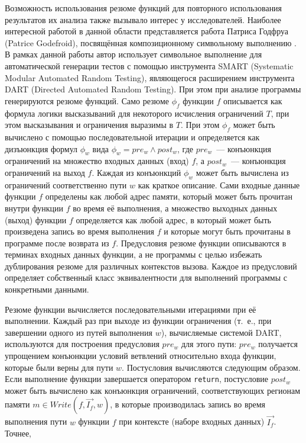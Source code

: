 Возможность использования резюме функций для повторного использования результатов их анализа также вызывало интерес у исследователей. Наиболее интересной работой в данной области представляется работа Патриса Годфруа (Patrice Godefroid), посвящённая композиционному символьному выполнению \cite{godefroid-comp}. В рамках данной работы автор использует символьное выполнение для автоматической генерации тестов с помощью инструмента SMART (Systematic Modular Automated Random Testing), являющегося расширением инструмента DART (Directed Automated Random Testing). При этом при анализе программы генерируются резюме функций. Само резюме $\phi_f$ функции $f$  описывается как формула логики высказываний для некоторого исчисления ограничений $T$, при этом высказывания и ограничения выразимы в $T$. При этом  $\phi_f$ может быть вычислено с помощью последовательной итерации и определяется как дизъюнкция формул $\phi_w$ вида $\phi_w = pre_w \wedge post_w$, где $pre_w$~--- конъюнкция ограничений на множество входных данных (вход) $f$, а $post_w$~--- конъюнкция ограничений на выход $f$. Каждая из конъюнкций $\phi_w$ может быть вычислена из ограничений соответственно пути $w$ как краткое описание. Сами входные данные функции $f$ определены как любой адрес памяти, который может быть прочитан внутри функции $f$ во время её выполнения, а множество выходных данных (выход) функции $f$ определяется как любой адрес, в который может быть произведена запись во время выполнения $f$ и которые могут быть прочитаны в программе после возврата из $f$. Предусловия резюме функции описываются в терминах входных данных функции, а не программы с целью избежать дублирования резюме для различных контекстов вызова. Каждое из предусловий определяет собственный класс эквивалентности для выполнений программы с конкретными данными.

Резюме функции вычисляется последовательными итерациями при её выполнении. Каждый раз при выходе из функции ограничения (т.~е., при завершении одного из путей выполнения $w$), вычисляемые системой DART, используются для построения предусловия $pre_w$ для этого пути: $pre_w$ получается упрощением конъюнкции условий ветвлений относительно входа функции, которые были верны для пути $w$. Постусловия вычисляются следующим образом. Если выполнение функции завершается оператором \texttt{return}, постусловие $post_w$ может быть вычислено как конъюнкция  ограничений, соответствующих регионам памяти $m \in Write(f, \overrightarrow{I_f}, w)$, в которые производилась запись во время выполнения пути $w$ функции $f$ при контексте (наборе входных данных) $\overrightarrow{I_f}$. Точнее, 

